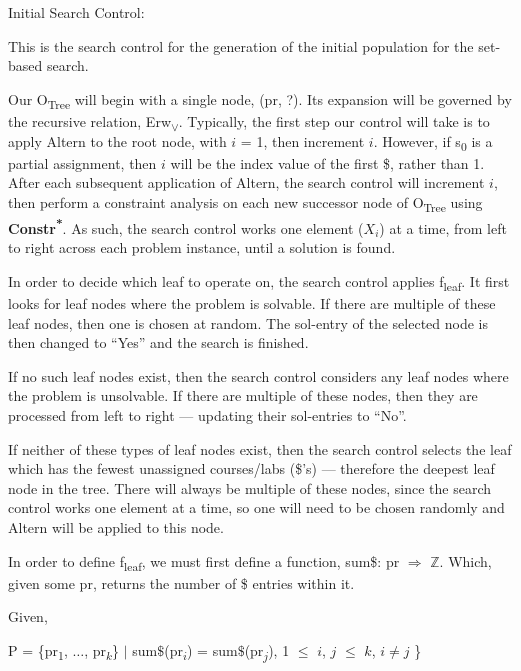 \documentclass[11pt, oneside]{article}   	%
\newenvironment{cmr}{\fontfamily{cmr}\selectfont}{\par}
\begin{document}

\begin{cmr}
\noindent Initial Search Control:

\noindent This is the search control for the generation of the initial population for the set-based search.

\noindent Our O\textsubscript{Tree} will begin with a single node, (pr, ?). Its expansion will be governed by the recursive relation, Erw\textsubscript{$\lor$}.
Typically, the first step our control will take is to apply Altern to the root node, with $i$ = 1, then increment $i$.
However, if s\textsubscript{0} is a partial assignment, then $i$ will be the index value of the first \$, rather than 1.
After each subsequent application of Altern, the search control will increment $i$, then perform a constraint analysis on each new successor node of O\textsubscript{Tree} using \textbf{Constr\textsuperscript{*}}.
As such, the search control works one element ($X_i$) at a time, from left to right across each problem instance, until a solution is found.

\noindent In order to decide which leaf to operate on, the search control applies f\textsubscript{leaf}. It first looks for leaf nodes where the problem is solvable. If there are multiple of these leaf nodes, then one is chosen at random. The sol-entry of the selected node is then changed to ``Yes'' and the search is finished.

\noindent If no such leaf nodes exist, then the search control considers any leaf nodes where the problem is unsolvable. If there are multiple of these nodes, then they are processed from left to right --- updating their sol-entries to ``No''.

\noindent If neither of these types of leaf nodes exist, then the search control selects the leaf which has the fewest unassigned courses/labs (\$'s) --- therefore the deepest leaf node in the tree. 
There will always be multiple of these nodes, since the search control works one element at a time, so one will need to be chosen randomly and Altern will be applied to this node.

\noindent In order to define f\textsubscript{leaf}, we must first define a function, sum\$: pr $\Rightarrow$ $\mathbb{Z}$. Which, given some pr, returns the number of \$ entries within it. 

\noindent Given,\\
\centerline{P =  \{pr\textsubscript{1}, $\dots$, pr\textsubscript{$k$}\} $\vert$ sum$\$$(pr\textsubscript{$i$}) = sum$\$$(pr\textsubscript{$j$}), 1 $\leq$ $i$, $j$ $\leq$ $k$, $i \neq j$ \}}


\end{cmr}
\end{document}
